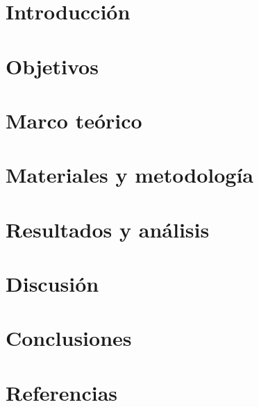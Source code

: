\documentclass[11pt,letterpaper,twocolumn]{article}
\begin{document}

\section{Introducción}

\section{Objetivos}

\section{Marco teórico}

\section{Materiales y metodología}

\section{Resultados y análisis}

\section{Discusión}

\section{Conclusiones}

\section{Referencias}

\end{document}
